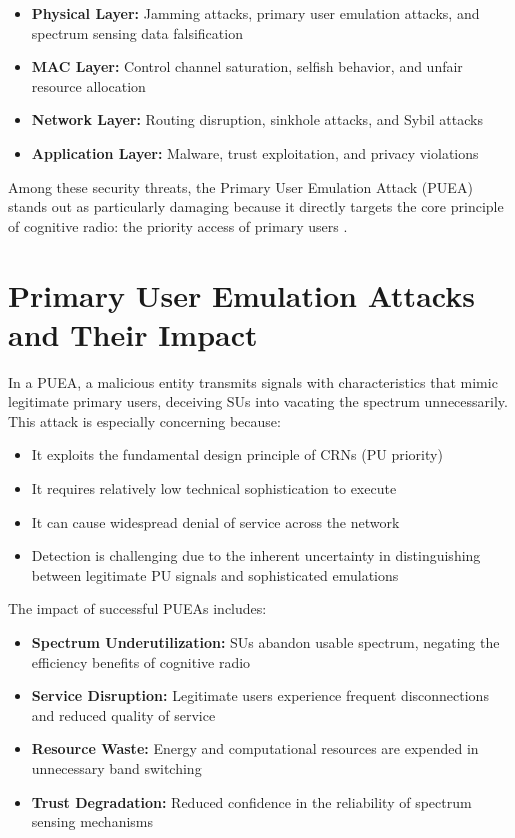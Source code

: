 \begin{itemize}
    \item \textbf{Physical Layer:} Jamming attacks, primary user emulation attacks, and spectrum sensing data falsification
    \item \textbf{MAC Layer:} Control channel saturation, selfish behavior, and unfair resource allocation
    \item \textbf{Network Layer:} Routing disruption, sinkhole attacks, and Sybil attacks
    \item \textbf{Application Layer:} Malware, trust exploitation, and privacy violations
\end{itemize}

Among these security threats, the Primary User Emulation Attack (PUEA) stands out as particularly damaging because it directly targets the core principle of cognitive radio: the priority access of primary users \cite{chen2008defense}.

\section{Primary User Emulation Attacks and Their Impact}

In a PUEA, a malicious entity transmits signals with characteristics that mimic legitimate primary users, deceiving SUs into vacating the spectrum unnecessarily. This attack is especially concerning because:

\begin{itemize}
    \item It exploits the fundamental design principle of CRNs (PU priority)
    \item It requires relatively low technical sophistication to execute
    \item It can cause widespread denial of service across the network
    \item Detection is challenging due to the inherent uncertainty in distinguishing between legitimate PU signals and sophisticated emulations
\end{itemize}

The impact of successful PUEAs includes:

\begin{itemize}
    \item \textbf{Spectrum Underutilization:} SUs abandon usable spectrum, negating the efficiency benefits of cognitive radio
    \item \textbf{Service Disruption:} Legitimate users experience frequent disconnections and reduced quality of service
    \item \textbf{Resource Waste:} Energy and computational resources are expended in unnecessary band switching
    \item \textbf{Trust Degradation:} Reduced confidence in the reliability of spectrum sensing mechanisms
\end{itemize}


